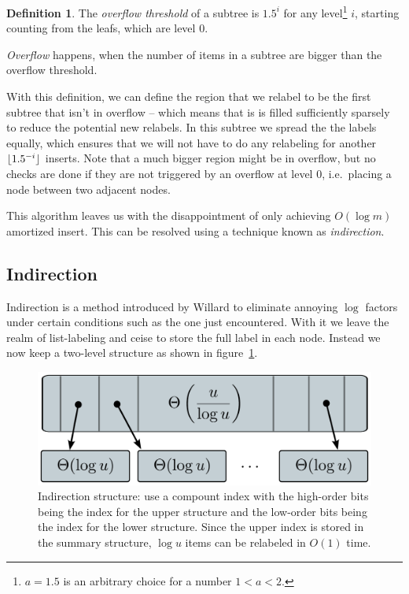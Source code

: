 \documentclass[11pt]{Thesis}
\DeclarePairedDelimiter\floor{\lfloor}{\rfloor}
\theoremstyle{definition}
\newtheorem*{defn}{Definition}
\newcommand{\Figref}[1]{figure~\ref{fig:#1}}
\newcommand{\figlabel}[1]{\label{fig:#1}}
\begin{document}
\begin{defn}
  The \emph{overflow threshold} of a subtree is $1.5^i$ for any 
  level\footnote{$a=1.5$ is an arbitrary choice for a number $1 < a < 2$.} $i$, 
  starting counting from the leafs, which are level 0.

  \emph{Overflow} happens, when the number of items in a subtree are bigger 
  than the overflow threshold.
\end{defn}

With this definition, we can define the region that we relabel to be the 
first subtree that isn't in overflow -- which means that is is filled 
sufficiently sparsely to reduce the potential new relabels. In this subtree 
we spread the the labels equally, which ensures that we will not have to 
do any relabeling for another $\floor{1.5^{-i}}$ inserts. Note that a much 
bigger region might be in overflow, but no checks are done if they are not 
triggered by an overflow at level 0, i.e.\ placing a node between two adjacent
nodes.

This algorithm leaves us with the disappointment of only achieving $O(\log m)$ 
amortized insert. This can be resolved using a technique known as 
\emph{indirection}.

\subsection{Indirection}
Indirection is a method introduced by Willard\cite{Will82a} to eliminate
annoying $\log$ factors under certain conditions such as the one just
encountered.  With it we leave the realm of list-labeling and ceise to store
the full label in each node. Instead we now keep a two-level structure 
as shown in \Figref{graphs/indirection}.

\begin{figure}[htpb]
  \centering
  \includegraphics[width=0.8\linewidth]{graphs/indirection}
  \caption{Indirection structure: use a compount index with the high-order 
  bits being the index for the upper structure and the low-order bits being 
the index for the lower structure. Since the upper index is stored in the 
summary structure, $\log u$ items can be relabeled in $O(1)$ time.}
  \figlabel{graphs/indirection}
\end{figure}
\end{document}
